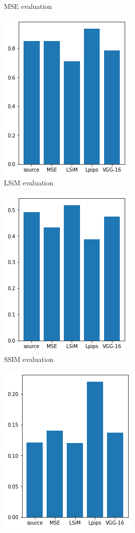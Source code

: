 \documentclass[a4paper,12pt,twoside]{report}
\begin{document}
\begin{figure}
\begin{subfigure}{0.32\textwidth}
		\caption{MSE evaluation}
	\end{subfigure}
	\begin{subfigure}{0.32\textwidth}
		\centering
		\includegraphics[scale=0.49]{karmanflow/lsim.png}
		\caption{LSiM evaluation}
	\end{subfigure}
	\begin{subfigure}{0.32\textwidth}
		\centering
		\includegraphics[scale=0.49]{karmanflow/ssim.png}
		\caption{SSIM evaluation}
	\end{subfigure}
	\begin{subfigure}{0.32\textwidth}
		\centering
		\includegraphics[scale=0.49]{karmanflow/lpips.png}

\end{subfigure}
\end{figure}
\end{document}

